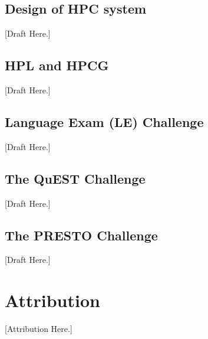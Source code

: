\documentclass[a4paper, 11pt]{article}
\begin{document}
		\subsection{Design of HPC system} [Draft Here.]
		\subsection{HPL and HPCG} [Draft Here.]
		\subsection{Language Exam (LE) Challenge} [Draft Here.]
		\subsection{The QuEST Challenge} [Draft Here.]
		\subsection{The PRESTO Challenge} [Draft Here.]

	\section*{Attribution} [Attribution Here.]



\end{document}
